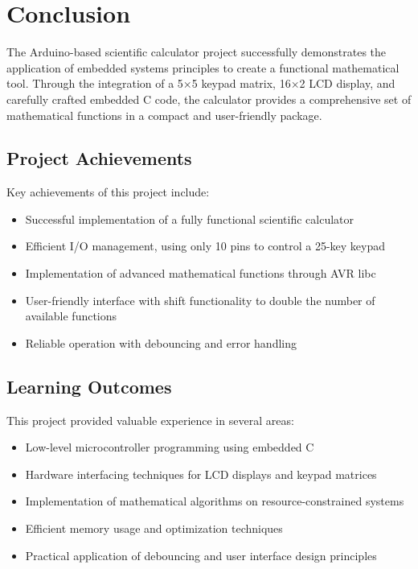 \documentclass[12pt]{article}
\begin{document}
	\section{Conclusion}
	The Arduino-based scientific calculator project successfully demonstrates the application of embedded systems principles to create a functional mathematical tool. Through the integration of a 5×5 keypad matrix, 16×2 LCD display, and carefully crafted embedded C code, the calculator provides a comprehensive set of mathematical functions in a compact and user-friendly package.
	
	\subsection{Project Achievements}
	Key achievements of this project include:
	\begin{itemize}
		\item Successful implementation of a fully functional scientific calculator
		\item Efficient I/O management, using only 10 pins to control a 25-key keypad
		\item Implementation of advanced mathematical functions through AVR libc
		\item User-friendly interface with shift functionality to double the number of available functions
		\item Reliable operation with debouncing and error handling
	\end{itemize}
	
	\subsection{Learning Outcomes}
	This project provided valuable experience in several areas:
	\begin{itemize}
		\item Low-level microcontroller programming using embedded C
		\item Hardware interfacing techniques for LCD displays and keypad matrices
		\item Implementation of mathematical algorithms on resource-constrained systems
		\item Efficient memory usage and optimization techniques
		\item Practical application of debouncing and user interface design principles
	\end{itemize}
	
\end{document}
